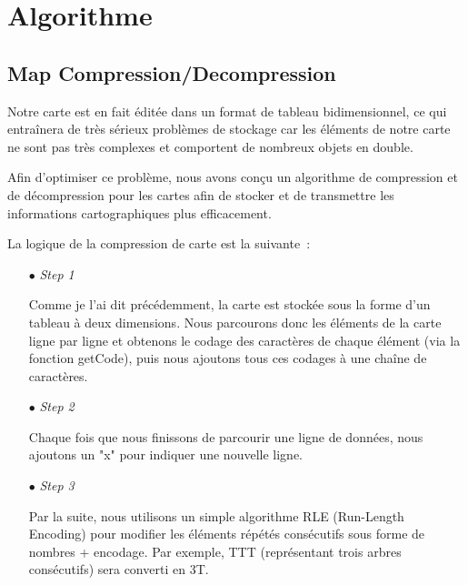 \documentclass[11pt,english]{article}
\begin{document}
\indent



\section{Algorithme}

\subsection{Map Compression/Decompression}

\indent

Notre carte est en fait éditée dans un format de tableau bidimensionnel, ce qui entraînera de très sérieux problèmes de stockage car les éléments de notre carte ne sont pas très complexes et comportent de nombreux objets en double.

\indent Afin d'optimiser ce problème, nous avons conçu un algorithme de compression et de décompression pour les cartes afin de stocker et de transmettre les informations cartographiques plus efficacement.

\indent La logique de la compression de carte est la suivante :

\small
{
\begin{itemize}
    \item [$\bullet$] \textit{Step 1}
    
    Comme je l'ai dit précédemment, la carte est stockée sous la forme d'un tableau à deux dimensions. Nous parcourons donc les éléments de la carte ligne par ligne et obtenons le codage des caractères de chaque élément (via la fonction getCode), puis nous ajoutons tous ces codages à une chaîne de caractères.

    \item [$\bullet$] \textit{Step 2}
    
    Chaque fois que nous finissons de parcourir une ligne de données, nous ajoutons un "x" pour indiquer une nouvelle ligne.

    \item [$\bullet$] \textit{Step 3}
    
    Par la suite, nous utilisons un simple algorithme RLE (Run-Length Encoding) pour modifier les éléments répétés consécutifs sous forme de nombres + encodage. Par exemple, TTT (représentant trois arbres consécutifs) sera converti en 3T.

\end{itemize}
}

\large
\end{document}
